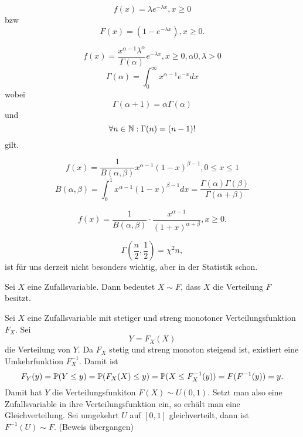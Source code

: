 				\begin{defi}
					\[ f(x)=\lambda e^{-\lambda x}, x\ge 0 \]
					bzw
					\[ F(x)=(1-e^{-\lambda x}), x\ge 0. \]					
				\end{defi}
				
				\begin{defi}[Gammaverteilung]
					\[ f(x)=\frac{x^{\alpha-1}\lambda^\alpha}{\Gamma(\alpha)}e^{-\lambda x}, x\ge 0, \alpha 0, \lambda >0 \]
					\[ \Gamma(\alpha)=\int_0^\infty x^{\alpha-1}e^{-x}dx \]
					wobei
					\[ \Gamma(\alpha+1)=\alpha\Gamma(\alpha) \]
					und
					\[ \forall n\in\N: \Gamma(n)=(n-1)! \]
					gilt.
				\end{defi}
				
				\begin{defi}
					\[ f(x)=\frac{1}{B(\alpha,\beta)} x^{\alpha-1}(1-x)^{\beta-1}, 0\le x\le 1\]
					\[ B(\alpha, \beta)=\int_0^1 x^{\alpha-1}(1-x)^{\beta-1} dx=\frac{\Gamma(\alpha)\Gamma(\beta)}{\Gamma(\alpha+\beta)} \]
				\end{defi}
				
				\begin{defi}
					\[ f(x)=\frac{1}{B(\alpha,\beta)}\cdot \frac{x^{\alpha-1}}{(1+x)^{\alpha+\beta}}, x\ge 0.\]
				\end{defi}
				
				\begin{defi}
					\[ \Gamma(\frac{n}{2},\frac{1}{2})=\chi^2 n, \]
					ist für uns derzeit nicht besonders wichtig, aber in der Statistik schon. 
				\end{defi}
				
				\begin{defi}
					Sei $X$ eine Zufallsvariable. Dann bedeutet $X\sim F$, dass $X$ die Verteilung $F$ besitzt. 
				\end{defi}
				
				\begin{bsp}
					Sei $X$ eine Zufallsvariable mit stetiger und streng monotoner Verteilungsfunktion $F_X$. Sei 
					\[ Y = F_X(X) \]
					die Verteilung von $Y$. Da $F_X$ stetig und streng monoton steigend ist, existiert eine Umkehrfunktion $F_X^{-1}$. Damit ist
					\[ F_Y(y)=\P(Y\le y)=\P(F_X(X)\le y)=\P(X\le F_X^{-1}(y))=F(F^{-1}(y))=y. \]
					Damit hat $Y$ die Verteilungsfunkiton $F(X)\sim U(0,1)$. Setzt man also eine Zufallsvariable in ihre Verteilungsfunktion ein, so erhält man eine Gleichverteilung. \newline
					Sei umgekehrt $U$ auf $[0,1]$ gleichverteilt, dann ist $F^{-1}(U)\sim F$. (Beweis übergangen)
				\end{bsp}
				
